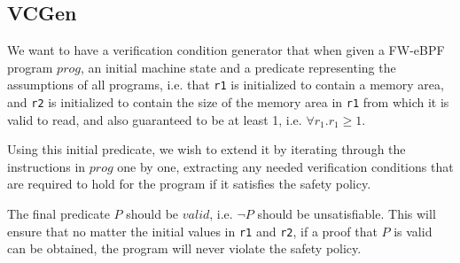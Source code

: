 \subsection{VCGen}
\label{subsec:vcgen}

We want to have a verification condition generator that when given a FW-eBPF program $prog$, an initial machine state and a predicate representing the assumptions of all programs, i.e. that \texttt{r1} is initialized to contain a memory area, and \texttt{r2} is initialized to contain the size of the memory area in \texttt{r1} from which it is valid to read, and also guaranteed to be at least 1, i.e. $\forall r_1 . r_1 \geq 1$.


Using this initial predicate, we wish to extend it by iterating through the instructions in $prog$ one by one, extracting any needed verification conditions that are required to hold for the program if it satisfies the safety policy.

The final predicate $P$ should be $valid$, i.e. $\neg P$ should be unsatisfiable.
This will ensure that no matter the initial values in \texttt{r1} and \texttt{r2}, if a proof that $P$ is valid can be obtained, the program will never violate the safety policy.

















